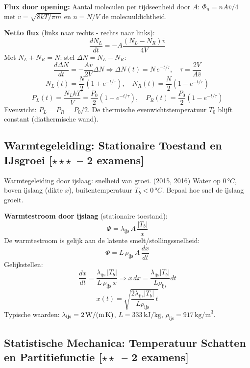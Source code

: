 \documentclass[10pt,a4paper]{article}
\begin{document}
\begin{oplossing}
\textbf{Flux door opening:} Aantal moleculen per tijdseenheid door $A$: $\Phi_n = nA\bar{v}/4$ met $\bar{v} = \sqrt{8kT/\pi m}$ en $n = N/V$ de molecuuldichtheid.

\textbf{Netto flux} (links naar rechts - rechts naar links):
$$\frac{dN_L}{dt} = -A\frac{(N_L - N_R)\bar{v}}{4V}$$
Met $N_L + N_R = N$: stel $\Delta N = N_L - N_R$:
$$\frac{d\Delta N}{dt} = -\frac{A\bar{v}}{2V}\Delta N \Rightarrow \Delta N(t) = N\,e^{-t/\tau}, \quad \tau = \frac{2V}{A\bar{v}}$$
$$N_L(t) = \frac{N}{2}(1 + e^{-t/\tau}), \quad N_R(t) = \frac{N}{2}(1 - e^{-t/\tau})$$
$$\boxed{P_L(t) = \frac{N_L kT}{V} = \frac{P_0}{2}(1+e^{-t/\tau}), \quad P_R(t) = \frac{P_0}{2}(1-e^{-t/\tau})}$$
Evenwicht: $P_L = P_R = P_0/2$. De thermische evenwichtstemperatuur $T_0$ blijft constant (diathermische wand).
\end{oplossing}

\subsection{Warmtegeleiding: Stationaire Toestand en IJsgroei \textnormal{\color{warningred}[$\star\star\star$\ -- 2 examens]}}

\begin{oefening}{Warmtegeleiding door ijslaag: snelheid van groei. \textnormal{(2015, 2016)}}
Water op $0\,°C$, boven ijslaag (dikte $x$), buitentemperatuur $T_b < 0\,°C$. Bepaal hoe snel de ijslaag groeit.
\end{oefening}

\begin{oplossing}
\textbf{Warmtestroom door ijslaag} (stationaire toestand):
$$\Phi = \lambda_\text{ijs}\, A\, \frac{|T_b|}{x}$$
De warmtestroom is gelijk aan de latente smelt/stollingssnelheid:
$$\Phi = L\,\rho_\text{ijs}\, A\, \frac{dx}{dt}$$
Gelijkstellen:
$$\frac{dx}{dt} = \frac{\lambda_\text{ijs}\,|T_b|}{L\,\rho_\text{ijs}\,x} \Rightarrow x\,dx = \frac{\lambda_\text{ijs}|T_b|}{L\rho_\text{ijs}}dt$$
$$\boxed{x(t) = \sqrt{\frac{2\lambda_\text{ijs}|T_b|}{L\rho_\text{ijs}}\,t}}$$
Typische waarden: $\lambda_\text{ijs} = 2\,\text{W/(m\,K)}$, $L = 333\,\text{kJ/kg}$, $\rho_\text{ijs} = 917\,\text{kg/m}^3$.
\end{oplossing}

\subsection{Statistische Mechanica: Temperatuur Schatten en Partitiefunctie \textnormal{\color{warningred}[$\star\star$\ -- 2 examens]}}
\end{document}
